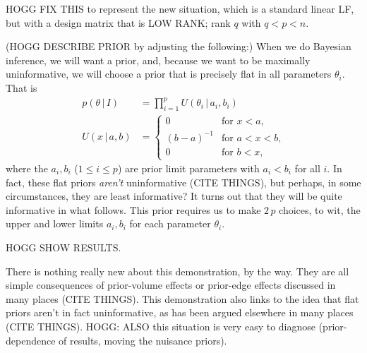 \documentclass{article}
\newcommand{\given}{\,|\,}
\begin{document}
HOGG FIX THIS to represent the new situation, which is a standard linear LF, but with a design matrix that is LOW RANK; rank $q$ with $q<p<n$.

(HOGG DESCRIBE PRIOR by adjusting the following:)
When we do Bayesian inference, we will want a prior, and, because we want to be maximally uninformative, we will choose a prior that is precisely flat in all parameters $\theta_i$.
That is
\begin{align}
    p(\theta\given I) &= \prod_{i=1}^p U(\theta_i\given a_i, b_i) \\
    U(x\given a, b) & = \left\{\begin{array}{cl}
    0 & \mbox{for $x<a$,} \\
    (b-a)^{-1} & \mbox{for $a<x<b$,} \\
    0 & \mbox{for $b<x$,}\end{array}\right.
\end{align}
where the $a_i, b_i$ ($1\leq i\leq p$) are prior limit parameters with $a_i<b_i$ for all $i$.
In fact, these flat priors \emph{aren't} uninformative (CITE THINGS), but perhaps, in some circumstances, they are least informative?
It turns out that they will be quite informative in what follows.
This prior requires us to make $2\,p$ choices, to wit, the upper and lower limits $a_i, b_i$ for each parameter $\theta_i$.

HOGG SHOW RESULTS.

There is nothing really new about this demonstration, by the way.
They are all simple consequences of prior-volume effects or prior-edge effects discussed in many places (CITE THINGS).
This demonstration also links to the idea that flat priors aren't in fact uninformative, as has been argued elsewhere in many places (CITE THINGS).
HOGG: ALSO this situation is very easy to diagnose (prior-dependence of results, moving the nuisance priors).
\end{document}
